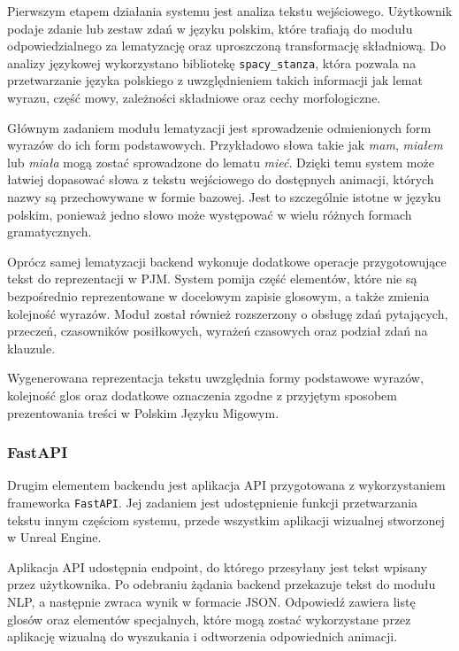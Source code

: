 \documentclass[12pt]{article}
\begin{document}
Pierwszym etapem działania systemu jest analiza tekstu wejściowego. Użytkownik podaje zdanie lub zestaw zdań w języku polskim, które trafiają do modułu odpowiedzialnego za lematyzację oraz uproszczoną transformację składniową. Do analizy językowej wykorzystano bibliotekę \texttt{spacy\_stanza}, która pozwala na przetwarzanie języka polskiego z uwzględnieniem takich informacji jak lemat wyrazu, część mowy, zależności składniowe oraz cechy morfologiczne.

Głównym zadaniem modułu lematyzacji jest sprowadzenie odmienionych form wyrazów do ich form podstawowych. Przykładowo słowa takie jak \textit{mam}, \textit{miałem} lub \textit{miała} mogą zostać sprowadzone do lematu \textit{mieć}. Dzięki temu system może łatwiej dopasować słowa z tekstu wejściowego do dostępnych animacji, których nazwy są przechowywane w formie bazowej. Jest to szczególnie istotne w języku polskim, ponieważ jedno słowo może występować w wielu różnych formach gramatycznych.

Oprócz samej lematyzacji backend wykonuje dodatkowe operacje przygotowujące tekst do reprezentacji w PJM. System pomija część elementów, które nie są bezpośrednio reprezentowane w docelowym zapisie glosowym, a także zmienia kolejność wyrazów. Moduł został również rozszerzony o obsługę zdań pytających, przeczeń, czasowników posiłkowych, wyrażeń czasowych oraz podział zdań na klauzule.

Wygenerowana reprezentacja tekstu uwzględnia formy podstawowe wyrazów, kolejność glos oraz dodatkowe oznaczenia zgodne z przyjętym sposobem prezentowania treści w Polskim Języku Migowym.

\subsubsection{FastAPI}

Drugim elementem backendu jest aplikacja API przygotowana z wykorzystaniem frameworka \texttt{FastAPI}. Jej zadaniem jest udostępnienie funkcji przetwarzania tekstu innym częściom systemu, przede wszystkim aplikacji wizualnej stworzonej w Unreal Engine.

Aplikacja API udostępnia endpoint, do którego przesyłany jest tekst wpisany przez użytkownika. Po odebraniu żądania backend przekazuje tekst do modułu NLP, a następnie zwraca wynik w formacie JSON. Odpowiedź zawiera listę glosów oraz elementów specjalnych, które mogą zostać wykorzystane przez aplikację wizualną do wyszukania i odtworzenia odpowiednich animacji.
\end{document}
